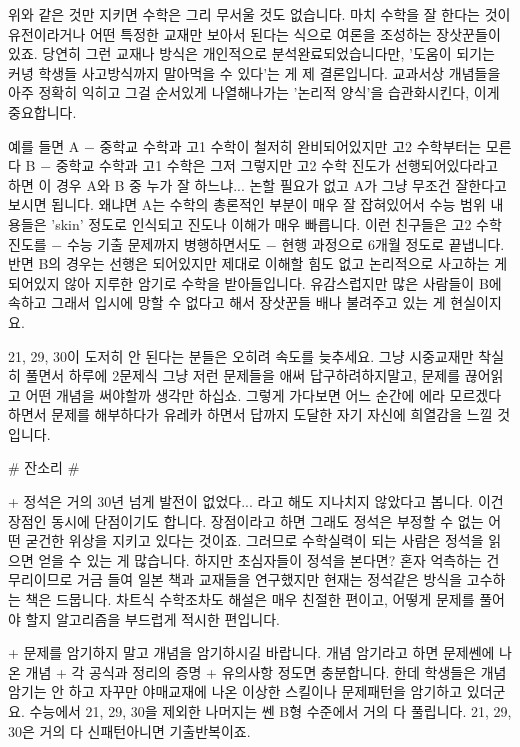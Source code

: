 위와 같은 것만 지키면 수학은 그리 무서울 것도 없습니다.
마치 수학을 잘 한다는 것이 유전이라거나 어떤 특정한 교재만 보아서 된다는 식으로 여론을 조성하는 장삿꾼들이 있죠.
당연히 그런 교재나 방식은 개인적으로 분석완료되었습니다만,
'도움이 되기는 커녕 학생들 사고방식까지 말아먹을 수 있다'는 게 제 결론입니다.
교과서상 개념들을 아주 정확히 익히고 그걸 순서있게 나열해나가는 '논리적 양식'을 습관화시킨다,
이게 중요합니다.
\vspace{5mm}

예를 들면
A $-$ 중학교 수학과 고1 수학이 철저히 완비되어있지만 고2 수학부터는 모른다
B $-$ 중학교 수학과 고1 수학은 그저 그렇지만 고2 수학 진도가 선행되어있다라고 하면
이 경우 A와 B 중 누가 잘 하느냐... 논할 필요가 없고 A가 그냥 무조건 잘한다고 보시면 됩니다.
왜냐면 A는 수학의 총론적인 부분이 매우 잘 잡혀있어서 수능 범위 내용들은 'skin' 정도로 인식되고 진도나 이해가 매우 빠릅니다.
이런 친구들은 고2  수학 진도를 $-$ 수능 기출 문제까지 병행하면서도 $-$ 현행 과정으로 6개월 정도로 끝냅니다.
반면 B의 경우는 선행은 되어있지만 제대로 이해할 힘도 없고 논리적으로 사고하는 게 되어있지 않아 지루한 암기로 수학을 받아들입니다.
유감스럽지만 많은 사람들이 B에 속하고 그래서 입시에 망할 수 없다고 해서 장삿꾼들 배나 불려주고 있는 게 현실이지요.
\vspace{5mm}

21, 29, 30이 도저히 안 된다는 분들은 오히려 속도를 늦추세요.
그냥 시중교재만 착실히 풀면서 하루에 2문제식 그냥 저런 문제들을 애써 답구하려하지말고, 문제를 끊어읽고 어떤 개념을 써야할까 생각만 하십쇼.
그렇게 가다보면 어느 순간에 에라 모르겠다 하면서 문제를 해부하다가 유레카 하면서 답까지 도달한 자기 자신에 희열감을 느낄 것입니다.
\vspace{5mm}

$\#$ 잔소리 $\#$
\vspace{5mm}

+ 정석은 거의 30년 넘게 발전이 없었다... 라고 해도 지나치지 않았다고 봅니다.
이건 장점인 동시에 단점이기도 합니다. 장점이라고 하면 그래도 정석은 부정할 수 없는 어떤 굳건한 위상을 지키고 있다는 것이죠.
그러므로 수학실력이 되는 사람은 정석을 읽으면 얻을 수 있는 게 많습니다.
하지만 초심자들이 정석을 본다면?
혼자 억측하는 건 무리이므로 거금 들여 일본 책과 교재들을 연구했지만 현재는 정석같은 방식을 고수하는 책은 드뭅니다.
차트식 수학조차도 해설은 매우 친절한 편이고, 어떻게 문제를 풀어야 할지 알고리즘을 부드럽게 적시한 편입니다.
\vspace{5mm}

+ 문제를 암기하지 말고 개념을 암기하시길 바랍니다.
개념 암기라고 하면 문제쎈에 나온 개념 + 각 공식과 정리의 증명 + 유의사항 정도면 충분합니다.
한데 학생들은 개념 암기는 안 하고 자꾸만 야매교재에 나온 이상한 스킬이나 문제패턴을 암기하고 있더군요.
수능에서 21, 29, 30을 제외한 나머지는 쎈 B형 수준에서 거의 다 풀립니다. 21, 29, 30은 거의 다 신패턴아니면 기출반복이죠.
\vspace{5mm}

